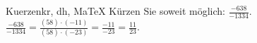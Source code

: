 \begin{MAufgabe}{Kuerzen}{kr, dh, MaTeX}
K\"urzen Sie soweit m\"oglich: $\frac{-638}{-1334}$.\\ 
\ifLsg\MLoesung
\quad $\frac{-638}{-1334}=\frac{(58)\cdot(-11)}{(58)\cdot(-23)}=\frac{-11}{-23}=\frac{11}{23}$.\else\relax\fi
 \end{MAufgabe}